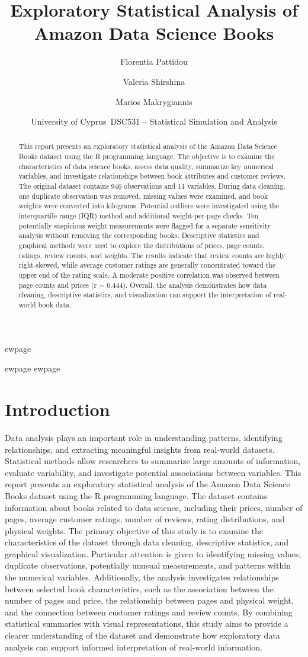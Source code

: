 \documentclass[11pt,a4paper]{article}
\title{Exploratory Statistical Analysis of
Amazon Data Science Books}
\author{
Florentia Pattidou \and
Valeria Shirshina \and
Marios Makrygiannis
}
\date{University of Cyprus\
DSC531 -- Statistical Simulation and Analysis}
\begin{document}
\maketitle
ewpage
\begin{abstract}
This report presents an exploratory statistical analysis of the Amazon Data Science Books dataset using the R programming language. The objective is to examine the characteristics of data science books, assess data quality, summarize key numerical variables, and investigate relationships between book attributes and customer reviews.
The original dataset contains 946 observations and 11 variables. During data cleaning, one duplicate observation was removed, missing values were examined, and book weights were converted into kilograms. Potential outliers were investigated using the interquartile range (IQR) method and additional weight-per-page checks. Ten potentially suspicious weight measurements were flagged for a separate sensitivity analysis without removing the corresponding books.
Descriptive statistics and graphical methods were used to explore the distributions of prices, page counts, ratings, review counts, and weights. The results indicate that review counts are highly right-skewed, while average customer ratings are generally concentrated toward the upper end of the rating scale. A moderate positive correlation was observed between page counts and prices (r = 0.444).
Overall, the analysis demonstrates how data cleaning, descriptive statistics, and visualization can support the interpretation of real-world book data.
\end{abstract}
ewpage
\tableofcontents
ewpage
\section{Introduction}
Data analysis plays an important role in understanding patterns, identifying relationships, and extracting meaningful insights from real-world datasets. Statistical methods allow researchers to summarize large amounts of information, evaluate variability, and investigate potential associations between variables.
This report presents an exploratory statistical analysis of the Amazon Data Science Books dataset using the R programming language. The dataset contains information about books related to data science, including their prices, number of pages, average customer ratings, number of reviews, rating distributions, and physical weights.
The primary objective of this study is to examine the characteristics of the dataset through data cleaning, descriptive statistics, and graphical visualization. Particular attention is given to identifying missing values, duplicate observations, potentially unusual measurements, and patterns within the numerical variables.
Additionally, the analysis investigates relationships between selected book characteristics, such as the association between the number of pages and price, the relationship between pages and physical weight, and the connection between customer ratings and review counts.
By combining statistical summaries with visual representations, this study aims to provide a clearer understanding of the dataset and demonstrate how exploratory data analysis can support informed interpretation of real-world information.
\end{document}
